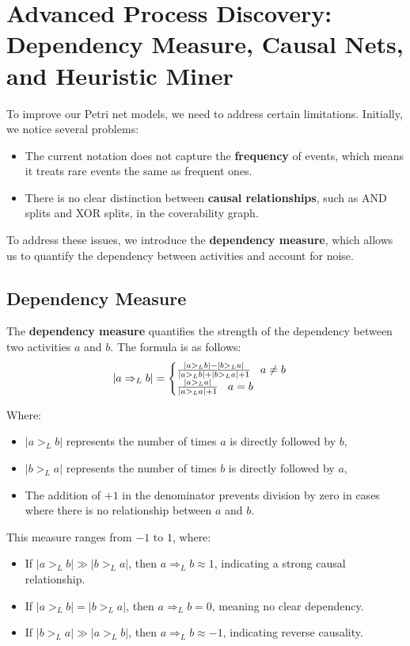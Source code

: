 \chapter{Advanced Process Discovery: Dependency Measure, Causal Nets, and Heuristic Miner}
To improve our Petri net models, we need to address certain limitations. Initially, we notice several problems:
\begin{itemize}
    \item The current notation does not capture the \textbf{frequency} of events, which means it treats rare events the same as frequent ones.
    \item There is no clear distinction between \textbf{causal relationships}, such as AND splits and XOR splits, in the coverability graph.
\end{itemize}
To address these issues, we introduce the \textbf{dependency measure}, which allows us to quantify the dependency between activities and account for noise.

\section{Dependency Measure}

The \textbf{dependency measure} quantifies the strength of the dependency between two activities \(a\) and \(b\). The formula is as follows:
\begin{equation}
    |a \Rightarrow_L b| =
\begin{cases}
\frac{|a >_L b| - |b >_L a|}{|a >_L b| + |b >_L a| + 1} \hspace{3mm} a \neq b \\
\frac{|a >_L a|}{|a >_L a|+1} \hspace{3mm} a = b
\end{cases}
\end{equation}

Where:
\begin{itemize}
    \item \(|a >_L b|\) represents the number of times \(a\) is directly followed by \(b\),
    \item \(|b >_L a|\) represents the number of times \(b\) is directly followed by \(a\),
    \item The addition of \(+1\) in the denominator prevents division by zero in cases where there is no relationship between \(a\) and \(b\).
\end{itemize}

This measure ranges from \(-1\) to \(1\), where:
\begin{itemize}
    \item If \(|a >_L b| \gg |b >_L a|\), then \(a \Rightarrow_L b \approx 1\), indicating a strong causal relationship.
    \item If \(|a >_L b| = |b >_L a|\), then \(a \Rightarrow_L b = 0\), meaning no clear dependency.
    \item If \(|b >_L a| \gg |a >_L b|\), then \(a \Rightarrow_L b \approx -1\), indicating reverse causality.
\end{itemize}

